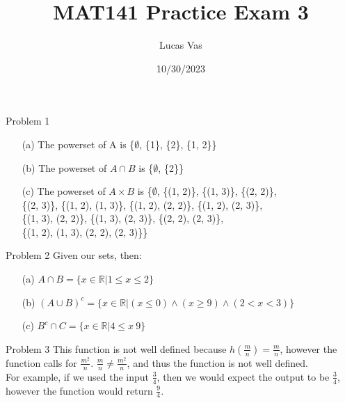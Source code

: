 \documentclass[12pt]{article}
\author{Lucas Vas}
\title{MAT141 Practice Exam 3}
\date{10/30/2023}
\begin{document}
    \maketitle

    \begin{problem}{Problem 1}
        \begin{itemize}
            \item[(a)] The powerset of A is \{$\emptyset$, \{1\}, \{2\}, \{1, 2\}\}
            \item[(b)] The powerset of $A \cap B$ is \{$\emptyset$, \{2\}\}
            \item[(c)] The powerset of $A \times B$ is \{$\emptyset$, \{(1, 2)\}, \{(1, 3)\}, \{(2, 2)\},\\
            \{(2, 3)\}, \{(1, 2), (1, 3)\}, \{(1, 2), (2, 2)\}, \{(1, 2), (2, 3)\},\\
            \{(1, 3), (2, 2)\}, \{(1, 3), (2, 3)\}, \{(2, 2), (2, 3)\},\\
            \{(1, 2), (1, 3), (2, 2), (2, 3)\}\}
        \end{itemize}
    \end{problem}

    \begin{problem}{Problem 2}
        Given our sets, then:
        \begin{itemize}
            \item[(a)] $A \cap B = \{x \in \mathbb{R} | 1 \leq x \leq 2\}$
            \item[(b)] $(A \cup B)^c = \{x \in \mathbb{R} | (x \leq 0) \wedge (x \geq 9) \wedge (2 < x < 3)\}$
            \item[(c)] $B^c \cap C = \{x \in \mathbb{R} | 4 \leq x \ 9\}$
        \end{itemize}
    \end{problem}

    \begin{problem}{Problem 3}
        This function is not well defined because $h\left(\frac{m}{n}\right) = \frac{m}{n}$, however the function calls for $\frac{m^2}{n}$.
        $\frac{m}{n} \neq \frac{m^2}{n}$, and thus the function is not well defined. \\ For example, if we used the input $\frac{3}{4}$,
        then we would expect the output to be $\frac{3}{4}$, however the function would return $\frac{9}{4}$. 
    \end{problem}
\end{document}
